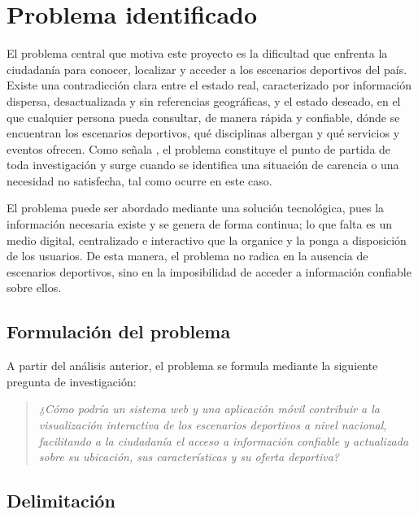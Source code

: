 
\section{Problema identificado}

El problema central que motiva este proyecto es la dificultad que enfrenta la
ciudadan\'ia para conocer, localizar y acceder a los escenarios deportivos del
pa\'is. Existe una contradicci\'on clara entre el estado real, caracterizado por
informaci\'on dispersa, desactualizada y sin referencias geogr\'aficas, y el
estado deseado, en el que cualquier persona pueda consultar, de manera
r\'apida y confiable, d\'onde se encuentran los escenarios deportivos, qu\'e
disciplinas albergan y qu\'e servicios y eventos ofrecen. Como se\~nala
\citet{arias2012}, el problema constituye el punto de partida de toda
investigaci\'on y surge cuando se identifica una situaci\'on de carencia o una
necesidad no satisfecha, tal como ocurre en este caso.

El problema puede ser abordado mediante una soluci\'on tecnol\'ogica, pues la
informaci\'on necesaria existe y se genera de forma continua; lo que falta es un
medio digital, centralizado e interactivo que la organice y la ponga a
disposici\'on de los usuarios. De esta manera, el problema no radica en la
ausencia de escenarios deportivos, sino en la imposibilidad de acceder a
informaci\'on confiable sobre ellos.

\subsection{Formulaci\'on del problema}

A partir del an\'alisis anterior, el problema se formula mediante la siguiente
pregunta de investigaci\'on:

\begin{quote}
\textit{¿C\'omo podr\'ia un sistema web y una aplicaci\'on m\'ovil contribuir a la
visualizaci\'on interactiva de los escenarios deportivos a nivel nacional,
facilitando a la ciudadan\'ia el acceso a informaci\'on confiable y actualizada
sobre su ubicaci\'on, sus caracter\'isticas y su oferta deportiva?}
\end{quote}

\subsection{Delimitaci\'on}

